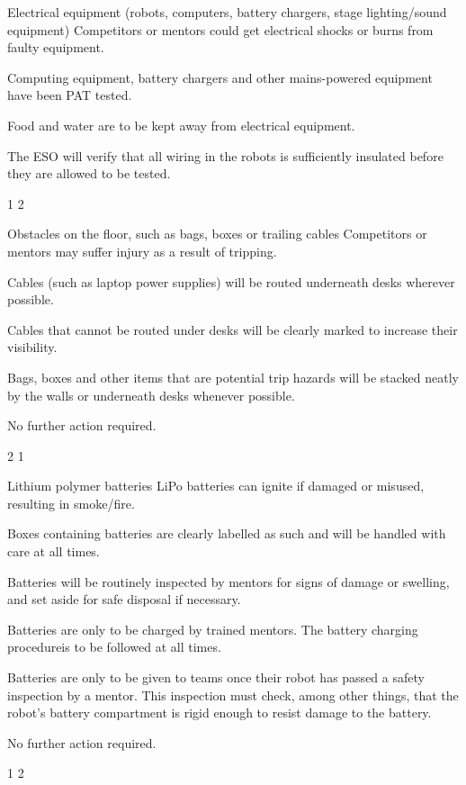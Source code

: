 {    \risk
        {Electrical equipment (robots, computers, battery chargers,
         stage lighting/sound equipment)}
        {Competitors or mentors could get electrical shocks or burns from faulty
         equipment.}
        {\item Computing equipment, battery chargers and other mains-powered
         equipment have been PAT tested.
         \item Food and water are to be kept away from electrical equipment.}
        {\item The ESO will verify that all wiring in the robots is sufficiently
         insulated before they are allowed to be tested.}
        {1} %
        {2} %

    \risk
        {Obstacles on the floor, such as bags, boxes or trailing cables}
        {Competitors or mentors may suffer injury as a result of tripping.}
        {\item Cables (such as laptop power supplies) will be routed underneath
         desks wherever possible.
         \item Cables that cannot be routed under desks will be clearly marked
         to increase their visibility.
         \item Bags, boxes and other items that are potential trip hazards will
         be stacked neatly by the walls or underneath desks whenever possible.}
        {\item No further action required.}
        {2} %
        {1} %

    \risk
        {Lithium polymer batteries}
        {LiPo batteries can ignite if damaged or misused, resulting in
         smoke/fire.}
        {\item Boxes containing batteries are clearly labelled as such and will
         be handled with care at all times.
         \item Batteries will be routinely inspected by mentors for signs of
         damage or swelling, and set aside for safe disposal if necessary.
         \item Batteries are only to be charged by trained mentors. The battery
         charging procedure\chargingfootnote is to be followed at all times.
         \item Batteries are only to be given to teams once their robot has
         passed a safety inspection by a mentor. This inspection must check,
         among other things, that the robot's battery compartment is rigid
         enough to resist damage to the battery.}
        {\item No further action required.}
        {1} %
        {2} %
}


